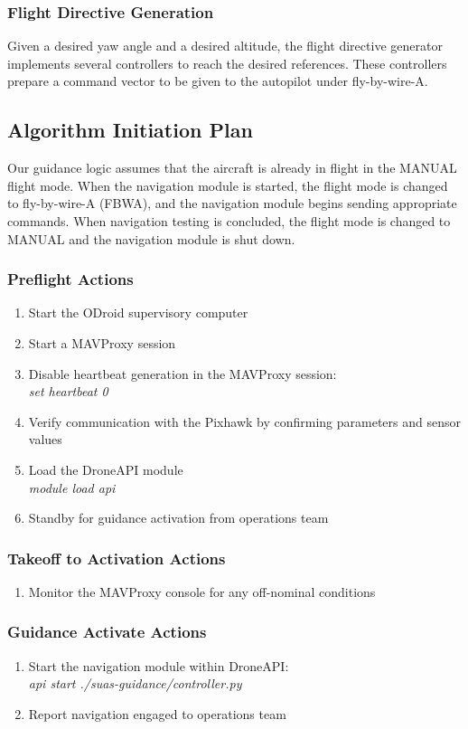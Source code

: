 \documentclass{aiaa}
\begin{document}
\subsubsection{Flight Directive Generation}
Given a desired yaw angle and a desired altitude, the flight directive generator implements several controllers to reach the desired references. These controllers prepare a command vector to be given to the autopilot under fly-by-wire-A. 
 
\subsection{Algorithm Initiation Plan}
Our guidance logic assumes that the aircraft is already in flight in the MANUAL flight mode. When the navigation module is started, the flight mode is changed to fly-by-wire-A (FBWA), and the navigation module begins sending appropriate commands. When navigation testing is concluded, the flight mode is changed to MANUAL and the navigation module is shut down.

\subsubsection{Preflight Actions}
\begin{enumerate}
	\item Start the ODroid supervisory computer
	\item Start a MAVProxy session
	\item Disable heartbeat generation in the MAVProxy session: \\
	\textit{set heartbeat 0}
	\item Verify communication with the Pixhawk by confirming parameters and sensor values
	\item Load the DroneAPI module \\
	\textit{module load api}
	\item Standby for guidance activation from operations team
\end{enumerate}
\subsubsection{Takeoff to Activation Actions}
\begin{enumerate}
	\item Monitor the MAVProxy console for any off-nominal conditions
\end{enumerate}
\subsubsection{Guidance Activate Actions}
\begin{enumerate}
	\item Start the navigation module within DroneAPI: \\
	\textit{api start ./suas-guidance/controller.py}
	\item Report navigation engaged to operations team
\end{enumerate}
\end{document}
